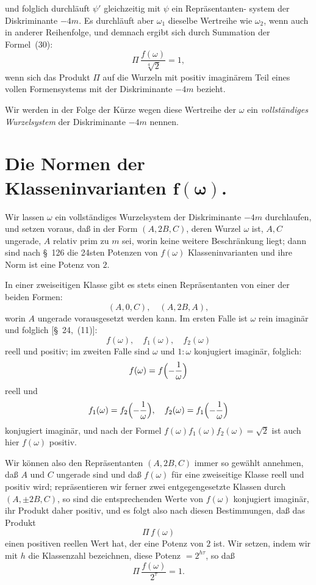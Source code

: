 \documentclass[12pt,a4paper]{article}
\theoremstyle{definition}
\begin{document}
und folglich durchläuft $\psi'$ gleichzeitig mit $\psi$ ein Repräsentanten-
system der Diskriminante $-4m$. Es durchläuft aber $\omega_{1}$ dieselbe 
Wertreihe wie $\omega_{2}$, wenn auch in anderer Reihenfolge, und demnach 
ergibt sich durch Summation der Formel~(30):
\begin{equation}
\varPi\,\frac{f(\omega)}{\sqrt[4]{2}} = 1,
\end{equation}
wenn sich das Produkt $\varPi$ auf die Wurzeln mit positiv imaginärem Teil 
eines vollen Formensystems mit der Diskriminante $-4m$ bezieht.

Wir werden in der Folge der Kürze wegen diese Wertreihe der $\omega$ ein 
\emph{vollständiges Wurzelsystem} der Diskriminante $-4m$ nennen.

\section{Die Normen der Klasseninvarianten $\boldsymbol{f(\omega)}$.}

Wir lassen $\omega$ ein vollständiges Wurzelsystem der Diskriminante $-4m$ 
durchlaufen, und setzen voraus, daß in der Form $(A, 2B, C)$, deren Wurzel 
$\omega$ ist, $A, C$ ungerade, $A$ relativ prim zu $m$ sei, worin keine 
weitere Beschränkung liegt; dann sind nach \S~126 die 24sten Potenzen von 
$f(\omega)$ Klasseninvarianten und ihre Norm ist eine Potenz von $2$.

In einer zweiseitigen Klasse gibt es stets einen Repräsentanten von einer 
der beiden Formen:
\[
(A, 0, C),\quad (A, 2B, A),
\]
worin $A$ ungerade vorausgesetzt werden kann. Im ersten Falle ist $\omega$ 
rein imaginär und folglich [\S~24,~(11)]:
\[
f(\omega),\quad f_{1}(\omega),\quad f_{2}(\omega)
\]
reell und positiv; im zweiten Falle sind $\omega$ und $1:\omega$ konjugiert 
imaginär, folglich:
\[
f(\omega) = f\Bigl(-\frac{1}{\omega}\Bigr)
\]
reell und
\[
f_{1}(\omega) = f_{2}\Bigl(-\frac{1}{\omega}\Bigr),\quad
f_{2}(\omega) = f_{1}\Bigl(-\frac{1}{\omega}\Bigr)
\]
konjugiert imaginär, und nach der Formel $f(\omega)f_{1}(\omega)f_{2}(\omega) 
= \sqrt{2}$ ist auch hier $f(\omega)$ positiv.

Wir können also den Repräsentanten $(A, 2B, C)$ immer so gewählt annehmen, 
daß $A$ und $C$ ungerade sind und daß $f(\omega)$ für eine zweiseitige 
Klasse reell und positiv wird; repräsentieren wir ferner zwei 
entgegengesetzte Klassen durch $(A, \pm 2B, C)$, so sind die entsprechenden 
Werte von $f(\omega)$ konjugiert imaginär, ihr Produkt daher positiv, und es 
folgt also nach diesen Bestimmungen, daß das Produkt
\[
\varPi\,f(\omega)
\]
einen positiven reellen Wert hat, der eine Potenz von $2$ ist. Wir setzen, 
indem wir mit $h$ die Klassenzahl bezeichnen, diese Potenz $= 2^{h\tau}$, so 
daß
\begin{equation}
\varPi\,\frac{f(\omega)}{2^{\tau}} = 1.
\end{equation}
\end{document}
